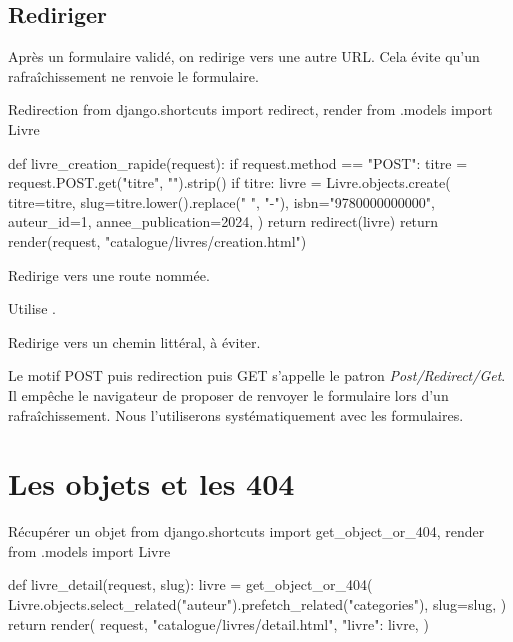 \subsection{Rediriger}

Après un formulaire validé, on redirige vers une autre URL. Cela évite qu'un
rafraîchissement ne renvoie le formulaire.

\begin{codebox}[python]{Redirection}
from django.shortcuts import redirect, render
from .models import Livre


def livre_creation_rapide(request):
    if request.method == "POST":
        titre = request.POST.get("titre", "").strip()
        if titre:
            livre = Livre.objects.create(
                titre=titre,
                slug=titre.lower().replace(" ", "-"),
                isbn="9780000000000",
                auteur_id=1,
                annee_publication=2024,
            )
            return redirect(livre)
    return render(request, "catalogue/livres/creation.html")
\end{codebox}

\begin{description}[leftmargin=4.4cm,style=nextline]
  \item[\code{redirect("catalogue:livre\_liste")}] Redirige vers une route nommée.
  \item[\code{redirect(livre)}] Utilise .
  \item[\code{redirect("/livres/")}] Redirige vers un chemin littéral, à éviter.
\end{description}

\begin{note}
Le motif \og POST puis redirection puis GET \fg{} s'appelle le patron
\emph{Post/Redirect/Get}. Il empêche le navigateur de proposer de renvoyer le
formulaire lors d'un rafraîchissement. Nous l'utiliserons systématiquement avec
les formulaires.
\end{note}

\section{Les objets et les 404}

\begin{codebox}[python]{Récupérer un objet}
from django.shortcuts import get_object_or_404, render
from .models import Livre


def livre_detail(request, slug):
    livre = get_object_or_404(
        Livre.objects.select_related("auteur").prefetch_related("categories"),
        slug=slug,
    )
    return render(
        request,
        "catalogue/livres/detail.html",
        {"livre": livre},
    )
\end{codebox}

